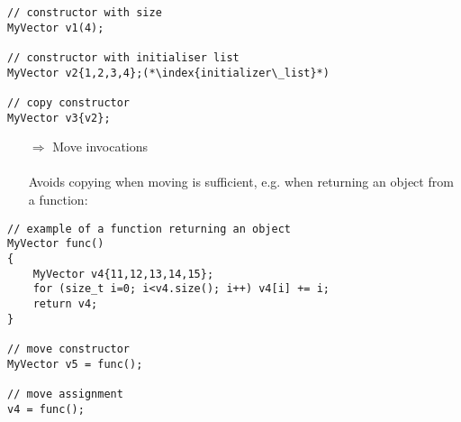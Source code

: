 \documentclass[10pt]{article}
\begin{document}
\begin{lstlisting}
// constructor with size
MyVector v1(4); 

// constructor with initialiser list
MyVector v2{1,2,3,4};(*\index{initializer\_list}*)

// copy constructor
MyVector v3{v2}; 
\end{lstlisting}
\begin{enumerate}
\item[$\Rightarrow$] Move invocations\\ \\ Avoids copying when moving is sufficient, e.g. when returning an object from a function:
\end{enumerate}
\begin{lstlisting}
// example of a function returning an object
MyVector func()
{
    MyVector v4{11,12,13,14,15};
    for (size_t i=0; i<v4.size(); i++) v4[i] += i;
    return v4;
}

// move constructor
MyVector v5 = func(); 

// move assignment
v4 = func();       
\end{lstlisting}
%
%
\end{document}
